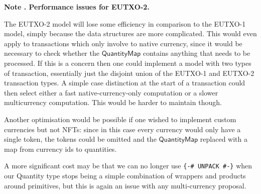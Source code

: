 \documentclass[a4paper]{article}
\newcounter{note}
\newcommand{\note}[1]{
  \bigskip
  \refstepcounter{note}
  \noindent\textbf{Note \thenote. #1}
}
\newcommand{\s}{\textsf}  %
\newcommand{\qtymap}{\ensuremath{\s{QuantityMap}}}
\begin{document}
\note{Performance issues for EUTXO-2.}
\label{note:eutxo-2-performance}
The EUTXO-2 model will lose some efficiency in comparison to the EUTXO-1
model, simply because the data structures are more complicated.  This
would even apply to transactions which only involve to native
currency, since it would be necessary to check whether the \qtymap{}
contains anything that needs to be processed.  If this is a concern
then one could implement a model with two types of transaction,
essentially just the disjoint union of the EUTXO-1 and EUTXO-2
transaction types. A simple case distinction at the start of a
transaction could then select either a fast native-currency-only
computation or a slower multicurrency computation.  This would be
harder to maintain though.

\smallskip  Another optimisation would be possible if one wished to
implement custom currencies but not NFTs: since in this case every
currency would only have a single token, the tokens could be omitted
and the $\qtymap$ replaced with a map from currency ids to quantities.

\smallskip A more significant cost may be that we can no longer use
\verb|{-# UNPACK #-}| when our Quantity type stops being a simple
combination of wrappers and products around primitives, but this is
again an issue with any multi-currency proposal.


\end{document}
